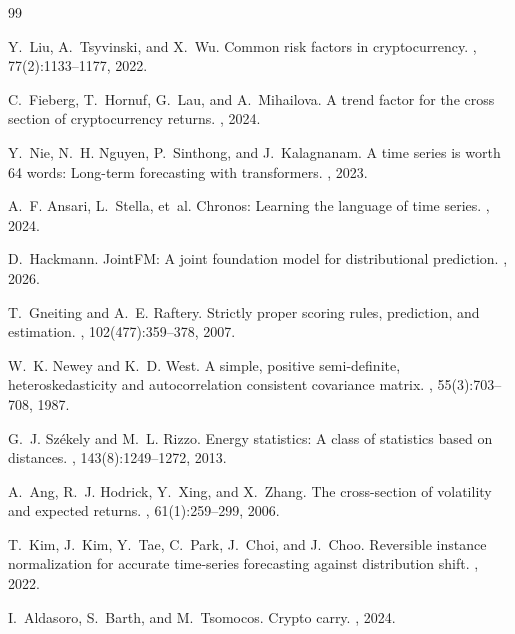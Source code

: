 \documentclass[sigconf]{acmart}
\begin{document}



\begin{thebibliography}{99}

Y.~Liu, A.~Tsyvinski, and X.~Wu.
\newblock Common risk factors in cryptocurrency.
, 77(2):1133--1177, 2022.

C.~Fieberg, T.~Hornuf, G.~Lau, and A.~Mihailova.
\newblock A trend factor for the cross section of cryptocurrency returns.
, 2024.

Y.~Nie, N.~H. Nguyen, P.~Sinthong, and J.~Kalagnanam.
\newblock A time series is worth 64 words: Long-term forecasting with transformers.
, 2023.

A.~F. Ansari, L.~Stella, et~al.
\newblock Chronos: Learning the language of time series.
, 2024.

D.~Hackmann.
\newblock JointFM: A joint foundation model for distributional prediction.
, 2026.

T.~Gneiting and A.~E. Raftery.
\newblock Strictly proper scoring rules, prediction, and estimation.
, 102(477):359--378, 2007.

W.~K. Newey and K.~D. West.
\newblock A simple, positive semi-definite, heteroskedasticity and autocorrelation consistent covariance matrix.
, 55(3):703--708, 1987.

G.~J. Sz{\'e}kely and M.~L. Rizzo.
\newblock Energy statistics: A class of statistics based on distances.
, 143(8):1249--1272, 2013.

A.~Ang, R.~J. Hodrick, Y.~Xing, and X.~Zhang.
\newblock The cross-section of volatility and expected returns.
, 61(1):259--299, 2006.

T.~Kim, J.~Kim, Y.~Tae, C.~Park, J.~Choi, and J.~Choo.
\newblock Reversible instance normalization for accurate time-series forecasting against distribution shift.
, 2022.

I.~Aldasoro, S.~Barth, and M.~Tsomocos.
\newblock Crypto carry.
, 2024.

\end{thebibliography}
\end{document}
